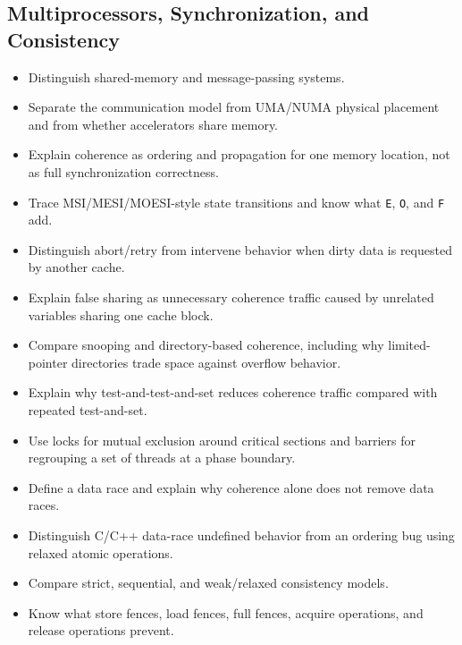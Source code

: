 \subsection*{Multiprocessors, Synchronization, and Consistency}
\begin{itemize}
    \item Distinguish shared-memory and message-passing systems.
    \item Separate the communication model from UMA/NUMA physical placement and from whether accelerators share memory.
    \item Explain coherence as ordering and propagation for one memory location, not as full synchronization correctness.
    \item Trace MSI/MESI/MOESI-style state transitions and know what \texttt{E}, \texttt{O}, and \texttt{F} add.
    \item Distinguish abort/retry from intervene behavior when dirty data is requested by another cache.
    \item Explain false sharing as unnecessary coherence traffic caused by unrelated variables sharing one cache block.
    \item Compare snooping and directory-based coherence, including why limited-pointer directories trade space against overflow behavior.
    \item Explain why test-and-test-and-set reduces coherence traffic compared with repeated test-and-set.
    \item Use locks for mutual exclusion around critical sections and barriers for regrouping a set of threads at a phase boundary.
    \item Define a data race and explain why coherence alone does not remove data races.
    \item Distinguish C/C++ data-race undefined behavior from an ordering bug using relaxed atomic operations.
    \item Compare strict, sequential, and weak/relaxed consistency models.
    \item Know what store fences, load fences, full fences, acquire operations, and release operations prevent.
\end{itemize}

